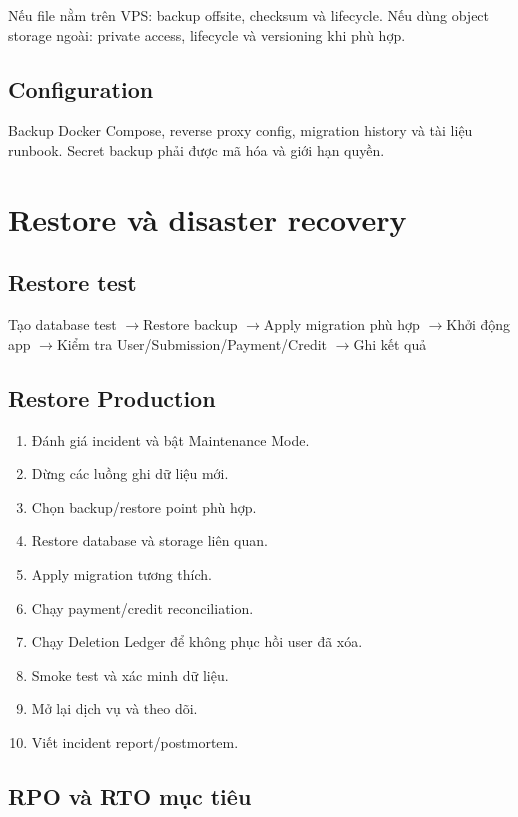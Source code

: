 \documentclass[11pt,a4paper]{article}
\newcommand{\arrow}{\ensuremath{\rightarrow}}
\begin{document}
Nếu file nằm trên VPS: backup offsite, checksum và lifecycle. Nếu dùng object storage ngoài: private access, lifecycle và versioning khi phù hợp.

\subsection{Configuration}

Backup Docker Compose, reverse proxy config, migration history và tài liệu runbook. Secret backup phải được mã hóa và giới hạn quyền.

\section{Restore và disaster recovery}

\subsection{Restore test}

\begin{flowbox}
Tạo database test \arrow Restore backup \arrow Apply migration phù hợp \arrow Khởi động app \arrow Kiểm tra User/Submission/Payment/Credit \arrow Ghi kết quả
\end{flowbox}

\subsection{Restore Production}

\begin{enumerate}
  \item Đánh giá incident và bật Maintenance Mode.
  \item Dừng các luồng ghi dữ liệu mới.
  \item Chọn backup/restore point phù hợp.
  \item Restore database và storage liên quan.
  \item Apply migration tương thích.
  \item Chạy payment/credit reconciliation.
  \item Chạy Deletion Ledger để không phục hồi user đã xóa.
  \item Smoke test và xác minh dữ liệu.
  \item Mở lại dịch vụ và theo dõi.
  \item Viết incident report/postmortem.
\end{enumerate}

\subsection{RPO và RTO mục tiêu}
\end{document}
